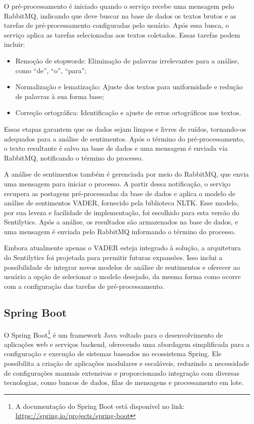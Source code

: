 \documentclass[
	12pt,				%
	oneside,			%
	a4paper,			%
	english,			%
	french,				%
	spanish,			%
	brazil				%
	]{abntex2}
\begin{document}
O pré-processamento é iniciado quando o serviço recebe uma mensagem pelo
RabbitMQ, indicando que deve buscar na base de dados os textos brutos e
as tarefas de pré-processamento configuradas pelo usuário. Após essa
busca, o serviço aplica as tarefas selecionadas aos textos coletados.
Essas tarefas podem incluir:

\begin{itemize}
\tightlist
\item
  Remoção de stopwords: Eliminação de palavras irrelevantes para a
  análise, como ``de'', ``o'', ``para'';
\item
  Normalização e lematização: Ajuste dos textos para uniformidade e
  redução de palavras à sua forma base;
\item
  Correção ortográfica: Identificação e ajuste de erros ortográficos nos
  textos.
\end{itemize}

Essas etapas garantem que os dados sejam limpos e livres de ruídos,
tornando-os adequados para a análise de sentimentos. Após o término do
pré-processamento, o texto resultante é salvo na base de dados e uma
mensagem é enviada via RabbitMQ, notificando o término do processo.

A análise de sentimentos também é gerenciada por meio do RabbitMQ, que
envia uma mensagem para iniciar o processo. A partir dessa notificação,
o serviço recupera as postagens pré-processadas da base de dados e
aplica o modelo de análise de sentimentos VADER, fornecido pela
biblioteca NLTK. Esse modelo, por sua leveza e facilidade de
implementação, foi escolhido para esta versão do Sentilytics. Após a
análise, os resultados são armazenados na base de dados, e uma mensagem
é enviada pelo RabbitMQ informando o término do processo.

Embora atualmente apenas o VADER esteja integrado à solução, a
arquitetura do Sentilytics foi projetada para permitir futuras
expansões. Isso inclui a possibilidade de integrar novos modelos de
análise de sentimentos e oferecer ao usuário a opção de selecionar o
modelo desejado, da mesma forma como ocorre com a configuração das
tarefas de pré-processamento.

\hypertarget{spring-boot}{%
\subsection{Spring Boot}\label{spring-boot}}

O Spring Boot\footnote{A documentação do Spring Boot está disponível no
  link: \url{https://spring.io/projects/spring-boot}} é um framework
Java voltado para o desenvolvimento de aplicações web e serviços
backend, oferecendo uma abordagem simplificada para a configuração e
execução de sistemas baseados no ecossistema Spring. Ele possibilita a
criação de aplicações modulares e escaláveis, reduzindo a necessidade de
configurações manuais extensivas e proporcionando integração com
diversas tecnologias, como bancos de dados, filas de mensagens e
processamento em lote.
\end{document}
